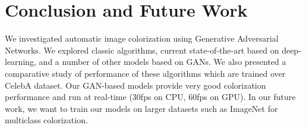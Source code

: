 \documentclass[10pt]{article}
\begin{document}
\section{Conclusion and Future Work}
We investigated automatic image colorization using Generative Adversarial Networks. 
We explored classic algorithms, current state-of-the-art based on deep-learning, and a number of other models based on GANs. 
We also presented a comparative study of performance of these algorithms which are trained over CelebA dataset. 
Our GAN-based models provide very good colorization performance and run at real-time ($30$fps on CPU, $60$fps on GPU). 
In our future work, we want to train our models on larger datasets such as ImageNet for multiclass colorization.

\pagebreak

\vspace{1mm}

\footnotesize

\end{document}
